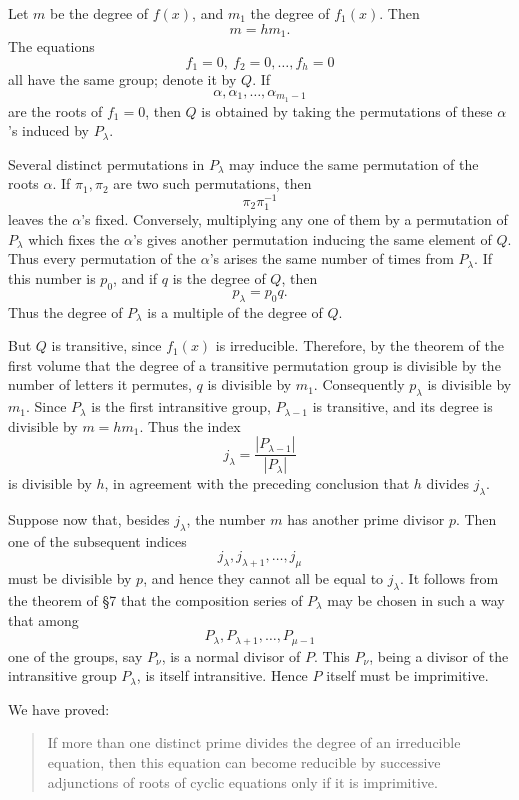 \documentclass[12pt,a4paper]{article}
\begin{document}
Let \(m\) be the degree of \(f(x)\), and \(m_1\) the degree of \(f_1(x)\).  Then
\[
 m=hm_1.
\]
The equations
\[
 f_1=0,\ f_2=0,\ldots,f_h=0
\]
all have the same group; denote it by \(Q\).  If
\[
 \alpha,\alpha_1,\ldots,\alpha_{m_1-1}
\]
are the roots of \(f_1=0\), then \(Q\) is obtained by taking the permutations of these \(\alpha\)'s induced by \(P_\lambda\).

Several distinct permutations in \(P_\lambda\) may induce the same permutation of the roots \(\alpha\).  If \(\pi_1,\pi_2\) are two such permutations, then
\[
 \pi_2\pi_1^{-1}
\]
leaves the \(\alpha\)'s fixed.  Conversely, multiplying any one of them by a permutation of \(P_\lambda\) which fixes the \(\alpha\)'s gives another permutation inducing the same element of \(Q\).  Thus every permutation of the \(\alpha\)'s arises the same number of times from \(P_\lambda\).  If this number is \(p_0\), and if \(q\) is the degree of \(Q\), then
\[
 p_\lambda=p_0q.
\]
Thus the degree of \(P_\lambda\) is a multiple of the degree of \(Q\).

But \(Q\) is transitive, since \(f_1(x)\) is irreducible.  Therefore, by the theorem of the first volume that the degree of a transitive permutation group is divisible by the number of letters it permutes, \(q\) is divisible by \(m_1\).  Consequently \(p_\lambda\) is divisible by \(m_1\).  Since \(P_\lambda\) is the first intransitive group, \(P_{\lambda-1}\) is transitive, and its degree is divisible by \(m=hm_1\).  Thus the index
\[
 j_\lambda=\frac{|P_{\lambda-1}|}{|P_\lambda|}
\]
is divisible by \(h\), in agreement with the preceding conclusion that \(h\) divides \(j_\lambda\).

Suppose now that, besides \(j_\lambda\), the number \(m\) has another prime divisor \(p\).  Then one of the subsequent indices
\[
 j_\lambda,j_{\lambda+1},\ldots,j_\mu
\]
must be divisible by \(p\), and hence they cannot all be equal to \(j_\lambda\).  It follows from the theorem of \S 7 that the composition series of \(P_\lambda\) may be chosen in such a way that among
\[
 P_\lambda,P_{\lambda+1},\ldots,P_{\mu-1}
\]
one of the groups, say \(P_\nu\), is a normal divisor of \(P\).  This \(P_\nu\), being a divisor of the intransitive group \(P_\lambda\), is itself intransitive.  Hence \(P\) itself must be imprimitive.

We have proved:

\begin{quote}
If more than one distinct prime divides the degree of an irreducible equation, then this equation can become reducible by successive adjunctions of roots of cyclic equations only if it is imprimitive.
\end{quote}
\end{document}
